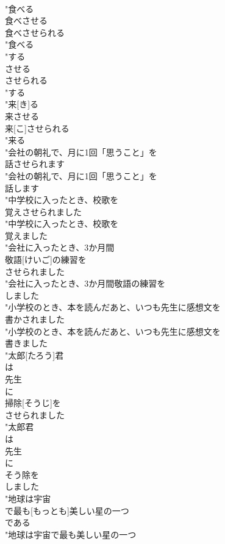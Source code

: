 \documentclass[8pt]{extreport}
\begin{document}
\begin{CJK}{UTF8}{min}
\\	"食べる 
\\	食べさせる 
\\	食べさせられる
\\	"食べる 
\\	"する 
\\	させる 
\\	させられる
\\	"する 
\\	"来[き]る 
\\	来させる 
\\	来[こ]させられる
\\	"来る 
\\	"会社の朝礼で、月に1回「思うこと」を
\\	話させられます
\\	"会社の朝礼で、月に1回「思うこと」を
\\	話します
\\	"中学校に入ったとき、校歌を
\\	覚えさせられました
\\	"中学校に入ったとき、校歌を
\\	覚えました
\\	"会社に入ったとき、3か月間
\\	敬語[けいご]の練習を
\\	させられました
\\	"会社に入ったとき、3か月間敬語の練習を
\\	しました
\\	"小学校のとき、本を読んだあと、いつも先生に感想文を
\\	書かされました
\\	"小学校のとき、本を読んだあと、いつも先生に感想文を
\\	書きました
\\	"太郎[たろう]君
\\	は
\\	先生
\\	に
\\	掃除[そうじ]を
\\	させられました
\\	"太郎君
\\	は
\\	先生
\\	に
\\	そう除を
\\	しました
\\	"地球は宇宙
\\	で最も[もっとも]美しい星の一つ
\\	である
\\	"地球は宇宙で最も美しい星の一つ

\end{CJK}
\end{document}
